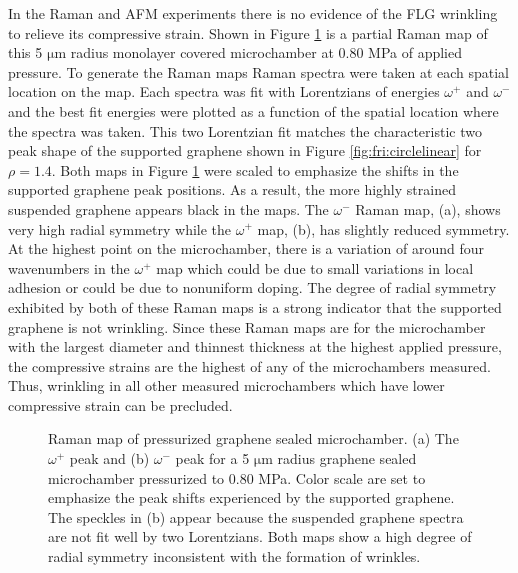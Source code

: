 In the Raman and AFM experiments there is no evidence of the FLG wrinkling to relieve its compressive strain.
Shown in Figure \ref{fig:fri:cylindrical} is a partial Raman map of this 5 $\mathrm{\mu}$m radius monolayer covered microchamber at 0.80 MPa of applied pressure.
To generate the Raman maps Raman spectra were taken at each spatial location on the map.
Each spectra was fit with Lorentzians of energies $\omega^+$ and $\omega^-$ and the best fit energies were plotted as a function of the spatial location where the spectra was taken.
This two Lorentzian fit matches the characteristic two peak shape of the supported graphene shown in Figure \ref{fig:fri:circlelinear} for $\rho=1.4$.
Both maps in Figure \ref{fig:fri:cylindrical} were scaled to emphasize the shifts in the supported graphene peak positions.
As a result, the more highly strained suspended graphene appears black in the maps.
The $\omega^-$ Raman map, (a), shows very high radial symmetry while the $\omega^+$ map, (b), has slightly reduced symmetry.
At the highest point on the microchamber, there is a variation of around four wavenumbers in the $\omega^+$ map which could be due to small variations in local adhesion or could be due to nonuniform doping.
The degree of radial symmetry exhibited by both of these Raman maps is a strong indicator that the supported graphene is not wrinkling.
Since these Raman maps are for the microchamber with the largest diameter and thinnest thickness at the highest applied pressure, the compressive strains are the highest of any of the microchambers measured.
Thus, wrinkling in all other measured microchambers which have lower compressive strain can be precluded.

\begin{figure}
	\begin{center}
	
	\end{center}
	\caption[Raman map of pressurized graphene sealed microchamber]{\label{fig:fri:cylindrical} Raman map of pressurized graphene sealed microchamber. (a) The $\omega^+$ peak and (b) $\omega^-$ peak for a 5 $\mathrm{\mu}$m radius graphene sealed microchamber pressurized to 0.80 MPa.  Color scale are set to emphasize the peak shifts experienced by the supported graphene.  The speckles in (b) appear because the suspended graphene spectra are not fit well by two Lorentzians.  Both maps show a high degree of radial symmetry inconsistent with the formation of wrinkles.}
\end{figure}

